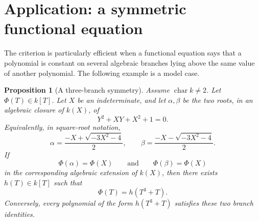 \documentclass[11pt]{article}
\theoremstyle{plain}
\newtheorem{proposition}[theorem]{Proposition}
\theoremstyle{definition}
\theoremstyle{remark}
\begin{document}
\section{Application: a symmetric functional equation}

The criterion is particularly efficient when a functional equation says that a polynomial is constant on several algebraic branches lying above the same value of another polynomial. The following example is a model case.

\begin{proposition}[A three-branch symmetry]\label{prop:symmetric-functional-equation}
Assume \(\operatorname{char} k\neq 2\). Let \(\Phi(T)\in k[T]\). Let \(X\) be an indeterminate, and let \(\alpha,\beta\) be the two roots, in an algebraic closure of \(k(X)\), of
\[
    Y^2+XY+X^2+1=0.
\]
Equivalently, in square-root notation,
\[
    \alpha=\frac{-X+\sqrt{-3X^2-4}}{2},
    \qquad
    \beta=\frac{-X-\sqrt{-3X^2-4}}{2}.
\]
If
\[
    \Phi(\alpha)=\Phi(X)
    \qquad\text{and}\qquad
    \Phi(\beta)=\Phi(X)
\]
in the corresponding algebraic extension of \(k(X)\), then there exists \(h(T)\in k[T]\) such that
\[
    \Phi(T)=h(T^3+T).
\]
Conversely, every polynomial of the form \(h(T^3+T)\) satisfies these two branch identities.
\end{proposition}
\end{document}
